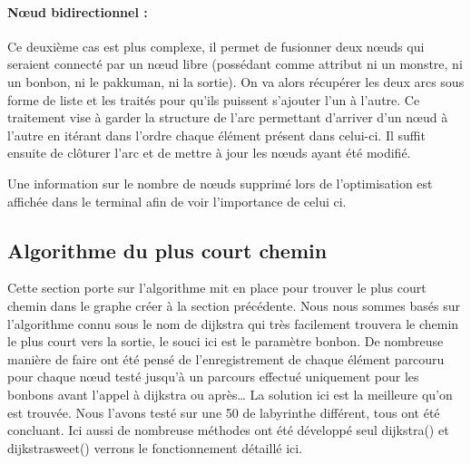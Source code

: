 \documentclass[12pt, oneside]{article}
\begin{document}
\paragraph{Nœud bidirectionnel :}
Ce deuxième cas est plus complexe, il permet de fusionner deux nœuds qui seraient connecté par un nœud libre (possédant comme attribut ni un monstre, ni un bonbon, ni le pakkuman, ni la sortie). 
On va alors récupérer les deux arcs sous forme de liste et les traités pour qu’ils puissent s’ajouter l’un à l’autre. Ce traitement vise à garder la structure de l’arc permettant d’arriver d’un nœud à l’autre en itérant dans l’ordre chaque élément présent dans celui-ci.
Il suffit ensuite de clôturer l’arc et de mettre à jour les nœuds ayant été modifié.

Une information sur le nombre de nœuds supprimé lors de l’optimisation est affichée dans le terminal afin de voir l’importance de celui ci.

\subsection{Algorithme du plus court chemin}
Cette section porte sur l’algorithme mit en place pour trouver le plus court chemin dans le graphe créer à la section précédente. Nous nous sommes basés sur l’algorithme connu sous le nom de dijkstra qui très facilement trouvera le chemin le plus court vers la sortie, le souci ici est le paramètre bonbon. De nombreuse manière de faire ont été pensé de l’enregistrement de chaque élément parcouru pour chaque nœud testé jusqu’à un parcours effectué uniquement pour les bonbons avant l’appel à dijkstra ou après… La solution ici est la meilleure qu’on est trouvée. Nous l’avons testé sur une 50 de labyrinthe différent, tous ont été concluant.
Ici aussi de nombreuse méthodes ont été développé seul dijkstra() et dijkstra\textunderscore sweet() verrons le fonctionnement détaillé ici. 
\end{document}
